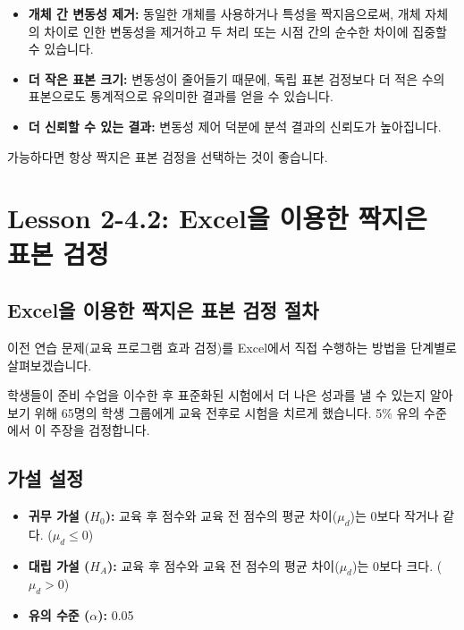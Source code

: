 \documentclass[11pt,a4paper]{book}
\theoremstyle{definition}
\begin{document}
\begin{summarybox}[title=짝지은 표본 검정의 장점]
\begin{itemize}
    \item \textbf{개체 간 변동성 제거:} 동일한 개체를 사용하거나 특성을 짝지음으로써, 개체 자체의 차이로 인한 변동성을 제거하고 두 처리 또는 시점 간의 순수한 차이에 집중할 수 있습니다.
    \item \textbf{더 작은 표본 크기:} 변동성이 줄어들기 때문에, 독립 표본 검정보다 더 적은 수의 표본으로도 통계적으로 유의미한 결과를 얻을 수 있습니다.
    \item \textbf{더 신뢰할 수 있는 결과:} 변동성 제어 덕분에 분석 결과의 신뢰도가 높아집니다.
\end{itemize}
가능하다면 항상 짝지은 표본 검정을 선택하는 것이 좋습니다.
\end{summarybox}


\section{Lesson 2-4.2: Excel을 이용한 짝지은 표본 검정}

\subsection{Excel을 이용한 짝지은 표본 검정 절차}
이전 연습 문제(교육 프로그램 효과 검정)를 Excel에서 직접 수행하는 방법을 단계별로 살펴보겠습니다.

\begin{examplebox}[title=시나리오:]
학생들이 준비 수업을 이수한 후 표준화된 시험에서 더 나은 성과를 낼 수 있는지 알아보기 위해 65명의 학생 그룹에게 교육 전후로 시험을 치르게 했습니다. 5\% 유의 수준에서 이 주장을 검정합니다.
\end{examplebox}

\subsection{가설 설정}
\begin{itemize}
    \item \textbf{귀무 가설 ($H_0$):} 교육 후 점수와 교육 전 점수의 평균 차이($\mu_d$)는 0보다 작거나 같다. ($\mu_d \le 0$)
    \item \textbf{대립 가설 ($H_A$):} 교육 후 점수와 교육 전 점수의 평균 차이($\mu_d$)는 0보다 크다. ($\mu_d > 0$)
    \item \textbf{유의 수준 ($\alpha$):} 0.05
\end{itemize}
\end{document}
